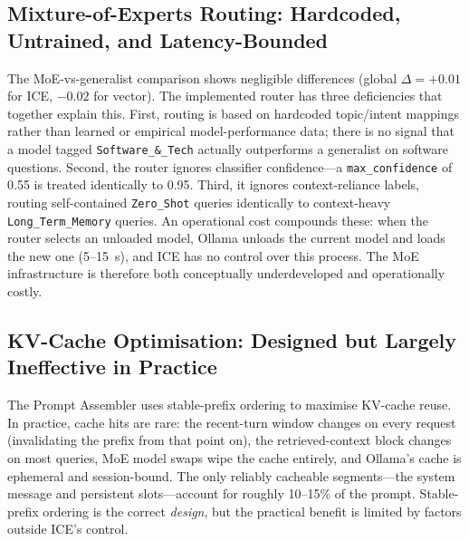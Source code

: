 \documentclass[10pt]{article}
\begin{document}
\subsection{Mixture-of-Experts Routing: Hardcoded, Untrained, and Latency-Bounded}
The MoE-vs-generalist comparison shows negligible differences (global $\Delta = +0.01$ for ICE, $-0.02$ for vector). The implemented router has three deficiencies that together explain this. First, routing is based on hardcoded topic/intent mappings rather than learned or empirical model-performance data; there is no signal that a model tagged \texttt{Software\_\&\_Tech} actually outperforms a generalist on software questions. Second, the router ignores classifier confidence---a \texttt{max\_confidence} of 0.55 is treated identically to 0.95. Third, it ignores context-reliance labels, routing self-contained \texttt{Zero\_Shot} queries identically to context-heavy \texttt{Long\_Term\_Memory} queries. An operational cost compounds these: when the router selects an unloaded model, Ollama unloads the current model and loads the new one (5--15~s), and ICE has no control over this process. The MoE infrastructure is therefore both conceptually underdeveloped and operationally costly.

\subsection{KV-Cache Optimisation: Designed but Largely Ineffective in Practice}
The Prompt Assembler uses stable-prefix ordering to maximise KV-cache reuse. In practice, cache hits are rare: the recent-turn window changes on every request (invalidating the prefix from that point on), the retrieved-context block changes on most queries, MoE model swaps wipe the cache entirely, and Ollama's cache is ephemeral and session-bound. The only reliably cacheable segments---the system message and persistent slots---account for roughly 10--15\% of the prompt. Stable-prefix ordering is the correct \emph{design}, but the practical benefit is limited by factors outside ICE's control.
\end{document}
